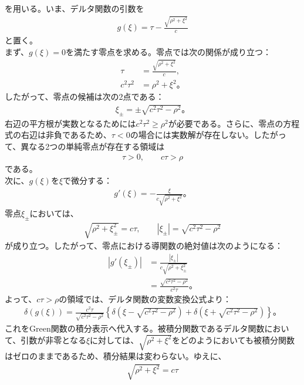 \documentclass[platex,dvipdfmx,a4paper]{jsarticle}
\begin{document}
  を用いる。いま、デルタ関数の引数を
  \begin{align*}
    g(\xi)=\tau-\frac{\sqrt{\rho^2+\xi^2}}{c}
  \end{align*}
  と置く。\\
  まず、$g(\xi)=0$を満たす零点を求める。零点では次の関係が成り立つ：
  \begin{align*}
    \tau
    &=\frac{\sqrt{\rho^2+\xi^2}}{c},\\
    c^2\tau^2
    &=\rho^2+\xi^2。
  \end{align*}
  したがって、零点の候補は次の2点である：
  \begin{align*}
    \xi_\pm=\pm\sqrt{c^2\tau^2-\rho^2}。
  \end{align*}
  右辺の平方根が実数となるためには$c^2\tau^2\geq\rho^2$が必要である。さらに、零点の方程式の右辺は非負であるため、$\tau<0$の場合には実数解が存在しない。したがって、異なる2つの単純零点が存在する領域は
  \begin{align*}
    \tau>0,
    \qquad
    c\tau>\rho
  \end{align*}
  である。\\
  次に、$g(\xi)$を$\xi$で微分する：
  \begin{align*}
    g'(\xi)
    =-\frac{\xi}{c\sqrt{\rho^2+\xi^2}}。
  \end{align*}
  零点$\xi_\pm$においては、
  \begin{align*}
    \sqrt{\rho^2+\xi_\pm^2}=c\tau,
    \qquad
    |\xi_\pm|=\sqrt{c^2\tau^2-\rho^2}
  \end{align*}
  が成り立つ。したがって、零点における導関数の絶対値は次のようになる：
  \begin{align*}
    |g'(\xi_\pm)|
    &=\frac{|\xi_\pm|}{c\sqrt{\rho^2+\xi_\pm^2}}\\
    &=\frac{\sqrt{c^2\tau^2-\rho^2}}{c^2\tau}。
  \end{align*}
  よって、$c\tau>\rho$の領域では、デルタ関数の変数変換公式より：
  \begin{align*}
    \delta(g(\xi))
    =
    \frac{c^2\tau}{\sqrt{c^2\tau^2-\rho^2}}
    \left\{
      \delta\left(\xi-\sqrt{c^2\tau^2-\rho^2}\right)
      +
      \delta\left(\xi+\sqrt{c^2\tau^2-\rho^2}\right)
    \right\}。
  \end{align*}
  これをGreen関数の積分表示へ代入する。被積分関数であるデルタ関数において、引数が非零となる$\xi$に対しては、$\sqrt{\rho^2+\xi^2}$をどのようにおいても被積分関数はゼロのままであるため、積分結果は変わらない。ゆえに、
  \begin{align*}
    \sqrt{\rho^2+\xi^2}=c\tau
  \end{align*}
\end{document}
